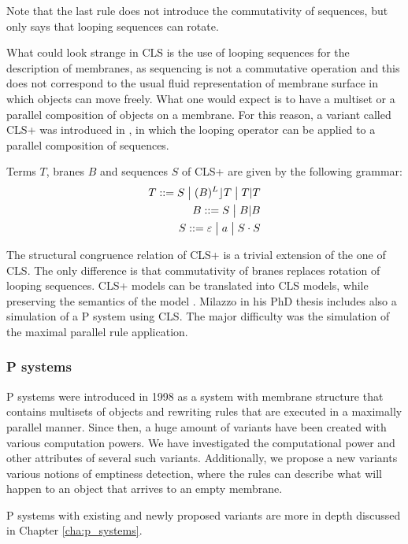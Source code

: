 Note that the last rule does not introduce the commutativity of sequences, but only says that looping sequences can rotate.

What could look strange in CLS is the use of looping sequences for the description of membranes, as sequencing is not a commutative operation and this does not correspond to the usual fluid representation of membrane surface in which objects can move freely. What one would expect is to have a multiset or a parallel composition of objects on a membrane. For this reason, a variant called CLS+ was introduced in \cite{Milazzo07CLS}, in which the looping operator can be applied
to a parallel composition of sequences.

\begin{definition}
  Terms $T$, branes $B$ and sequences $S$ of CLS+ are given by the following grammar:
  \begin{align*}
    T ::= S \;\big|\; (B)^L\rfloor T \;\big|\; T|T\\
    B ::= S \;\big|\; B|B\\
    S ::= \varepsilon \;\big|\; a \;\big|\; S\cdot S
  \end{align*}
\end{definition}

The structural congruence relation of CLS+ is a trivial extension of the one of CLS. The only difference is that commutativity of branes replaces rotation of looping sequences. CLS+ models can be translated into CLS models, while preserving the semantics of the model \cite{Barbuti07CLS}. Milazzo in his PhD thesis \cite{Milazzo07CLS} includes also a simulation of a P system using CLS. The major difficulty was the simulation of the maximal parallel rule application.



\subsubsection{P systems} %
\label{subs:p_systems}

 P systems \cite{Paun98} were introduced in 1998 as a system with membrane structure that contains multisets of objects and rewriting rules that are executed in a maximally parallel manner. Since then, a huge amount of variants have been created with various computation powers. We have investigated the computational power and other attributes of several such variants. Additionally, we propose a new variants various notions of emptiness detection, where the rules can describe what will happen to an object that arrives to an empty membrane.

P systems with existing and newly proposed variants are more in depth discussed in Chapter \ref{cha:p_systems}.



